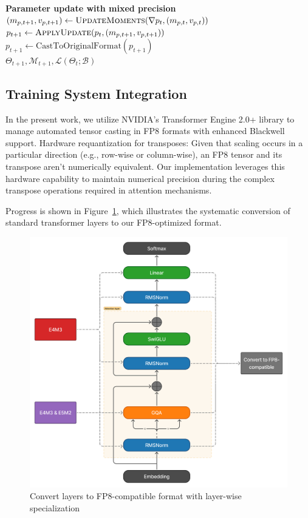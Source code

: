 \documentclass[conference]{IEEEtran}
\begin{document}
\begin{algorithm}[hbt!]
\begin{algorithmic}
\Statex

\State \textbf{Parameter update with mixed precision}
  \State $(m_{p,t+1},v_{p,t+1}) \gets \textsc{UpdateMoments}(\nabla p_t,(m_{p,t},v_{p,t}))$
  \State $p_{t+1} \gets \textsc{ApplyUpdate}(p_t,(m_{p,t+1},v_{p,t+1}))$
  \State $p_{t+1} \gets \text{CastToOriginalFormat}(p_{t+1})$
\EndFor
\vspace{0.3cm}\\
\hline
\State \Return $\Theta_{t+1}, \mathcal{M}_{t+1}, \mathcal{L}(\Theta_t;\mathcal{B})$
\end{algorithmic}
\end{algorithm}

\subsection{Training System Integration}

In the present work, we utilize NVIDIA's Transformer Engine 2.0+ library to manage automated tensor casting in FP8 formats with enhanced Blackwell support. Hardware requantization for transposes: Given that scaling occurs in a particular direction (e.g., row-wise or column-wise), an FP8 tensor and its transpose aren't numerically equivalent. Our implementation leverages this hardware capability to maintain numerical precision during the complex transpose operations required in attention mechanisms.

Progress is shown in Figure~\ref{fig:fp8_convert}, which illustrates the systematic conversion of standard transformer layers to our FP8-optimized format.

\begin{figure}[htbp]
    \centering
    \includegraphics[width=1\linewidth]{fp8_convert.png}
    \caption{Convert layers to FP8-compatible format with layer-wise specialization}
    \label{fig:fp8_convert}
\end{figure}
\end{document}
